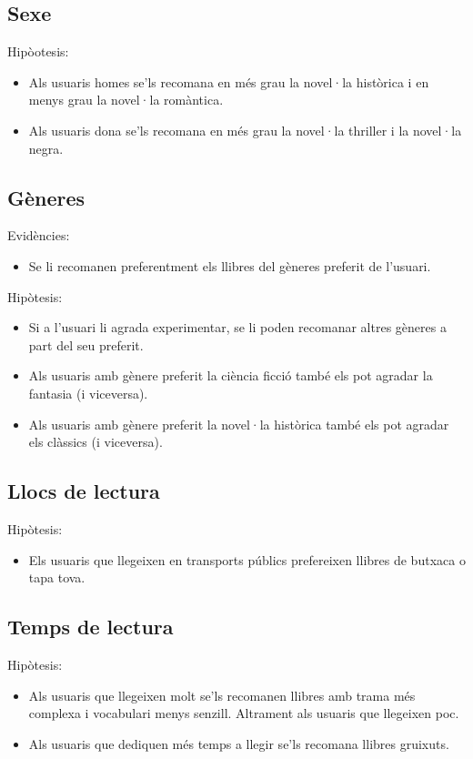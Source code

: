 \subsection{Sexe}
Hipòotesis:
\begin{itemize}
  \item Als usuaris homes se'ls recomana en més grau la novel·la històrica i en menys grau la novel·la romàntica.
  \item Als usuaris dona se'ls recomana en més grau la novel·la thriller i la novel·la negra.
\end{itemize}

\subsection{Gèneres}
Evidències:
\begin{itemize}
  \item Se li recomanen preferentment els llibres del gèneres preferit de l'usuari.  
\end{itemize}
Hipòtesis:
\begin{itemize}
  \item Si a l'usuari li agrada experimentar, se li poden recomanar altres gèneres a part del seu preferit.  
  \item Als usuaris amb gènere preferit la ciència ficció també els pot agradar la fantasia (i viceversa).
  \item Als usuaris amb gènere preferit la novel·la històrica també els pot agradar els clàssics (i viceversa).
\end{itemize}

\subsection{Llocs de lectura}
Hipòtesis:
\begin{itemize}
  \item Els usuaris que llegeixen en transports públics prefereixen llibres de butxaca o tapa tova.
\end{itemize}

\subsection{Temps de lectura}
Hipòtesis:
\begin{itemize}
  \item Als usuaris que llegeixen molt se'ls recomanen llibres amb trama més complexa i vocabulari menys senzill. Altrament als usuaris que llegeixen poc.
  \item Als usuaris que dediquen més temps a llegir se'ls recomana llibres gruixuts.
\end{itemize}

